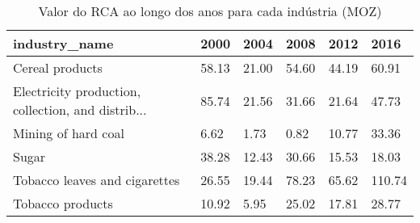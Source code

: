 \begin{table}
\centering
\caption{Valor do RCA ao longo dos anos para cada indústria (MOZ)}
\begin{tabular}{p{6cm}p{1.5cm}p{1.5cm}p{1.5cm}p{1.5cm}p{1.5cm}}
\toprule
                                     industry\_name &  2000 &  2004 &  2008 &  2012 &   2016 \\
\midrule
                                   Cereal products & 58.13 & 21.00 & 54.60 & 44.19 &  60.91 \\
Electricity production, collection, and distrib... & 85.74 & 21.56 & 31.66 & 21.64 &  47.73 \\
                               Mining of hard coal &  6.62 &  1.73 &  0.82 & 10.77 &  33.36 \\
                                             Sugar & 38.28 & 12.43 & 30.66 & 15.53 &  18.03 \\
                     Tobacco leaves and cigarettes & 26.55 & 19.44 & 78.23 & 65.62 & 110.74 \\
                                  Tobacco products & 10.92 &  5.95 & 25.02 & 17.81 &  28.77 \\
\bottomrule
\end{tabular}
\end{table}
